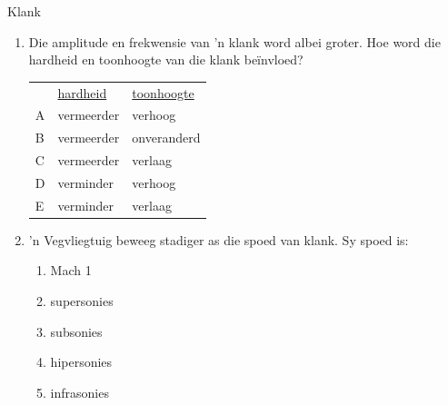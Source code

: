 \begin{eocexercises}{Klank}
\begin{enumerate}[noitemsep, label=\textbf{\arabic*}. ]
\item Die amplitude en frekwensie van 'n klank word albei groter. Hoe word die hardheid en toonhoogte van die klank be\"invloed?
          \begin{table}[H]
        \begin{center}
      \label{m38800*id186726}
    \noindent
      \tablelasttail{}
      \begin{xtabular}[t]{|l|l|l|}\hline
         &
        \uline{hardheid} &
        \uline{toonhoogte}%
     \tabularnewline{}
        A &
        vermeerder &
        verhoog%
     \tabularnewline{}
        B &
        vermeerder &
        onveranderd%
     \tabularnewline{}
        C &
        vermeerder &
        verlaag%
     \tabularnewline{}
        D &
        verminder &
        verhoog%
     \tabularnewline{}
        E &
        verminder &
        verlaag%
     \tabularnewline{}
    \end{xtabular}
      \end{center}
\end{table}
    \par

\item 'n Vegvliegtuig beweeg stadiger as die spoed van klank. Sy spoed is:
\begin{enumerate}[noitemsep, label=\textbf{\alph*}. ] 
\item Mach 1
\item supersonies
\item subsonies
\item hipersonies
\item infrasonies
\end{enumerate}
                

\end{enumerate}
\end{eocexercises}
